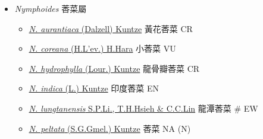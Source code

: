 
  \begin{itemize}
 \item[] \textit{Nymphoides} 莕菜屬
                                
  \begin{itemize}
        \item[] \href{http://www.theplantlist.org/tpl1.1/search?q=Nymphoides+aurantiaca}{\textit{N. aurantiaca} (Dalzell) Kuntze}   黃花莕菜   CR
        \item[] \href{http://www.theplantlist.org/tpl1.1/search?q=Nymphoides+coreana}{\textit{N. coreana} (H.L'ev.) H.Hara}   小莕菜   VU
        \item[] \href{http://www.theplantlist.org/tpl1.1/search?q=Nymphoides+hydrophylla}{\textit{N. hydrophylla} (Lour.) Kuntze}   龍骨瓣莕菜   CR
        \item[] \href{http://www.theplantlist.org/tpl1.1/search?q=Nymphoides+indica}{\textit{N. indica} (L.) Kuntze}   印度莕菜   EN
        \item[] \href{http://www.theplantlist.org/tpl1.1/search?q=Nymphoides+lungtanensis}{\textit{N. lungtanensis} S.P.Li., T.H.Hsieh \& C.C.Lin}   龍潭莕菜  \# EW
        \item[] \href{http://www.theplantlist.org/tpl1.1/search?q=Nymphoides+peltata}{\textit{N. peltata} (S.G.Gmel.) Kuntze}   莕菜   NA (N)
  \end{itemize}
  \end{itemize}
